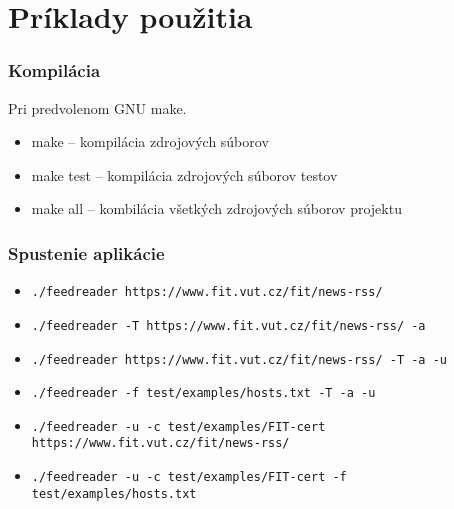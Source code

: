 \chapter{Príklady použitia}
\label{examples}
\subsection*{Kompilácia}
Pri predvolenom GNU make.
\begin{itemize}
  \item{make -- kompilácia zdrojových súborov}
  \item{make test -- kompilácia zdrojových súborov testov}
  \item{make all -- kombilácia všetkých zdrojových súborov projektu}
\end{itemize}
\subsection*{Spustenie aplikácie}
\begin{itemize}
  \item{{\tt ./feedreader https://www.fit.vut.cz/fit/news-rss/}}
  \item{{\tt ./feedreader -T https://www.fit.vut.cz/fit/news-rss/ -a}}
  \item{{\tt ./feedreader https://www.fit.vut.cz/fit/news-rss/ -T -a -u}}
  \item{{\tt ./feedreader -f test/examples/hosts.txt -T -a -u}}
  \item{{\tt ./feedreader -u -c test/examples/FIT-cert https://www.fit.vut.cz/fit/news-rss/}}
  \item{{\tt ./feedreader -u -c test/examples/FIT-cert -f test/examples/hosts.txt}}
\end{itemize}
